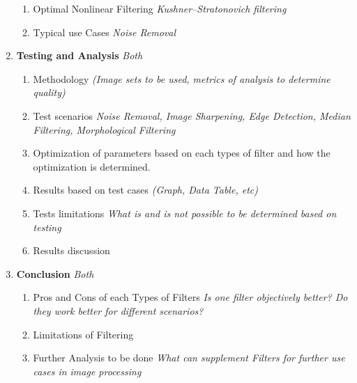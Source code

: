 \documentclass{article}
\begin{document}
\begin{enumerate}[label=\Roman*.]
\begin{enumerate}[label=\arabic*.]
                \item Optimal Nonlinear Filtering \textit{Kushner–Stratonovich filtering}
                \item Typical use Cases \textit{Noise Removal}
            \end{enumerate}
        \item \textbf{Testing and Analysis} \emph{Both}
            \begin{enumerate}[label=\arabic*.]
                \item Methodology \textit{(Image sets to be used, metrics of analysis to determine quality)}
                \item Test scenarios \textit{Noise Removal, Image Sharpening, Edge Detection, Median Filtering, Morphological Filtering}
                \item Optimization of parameters based on each types of filter and how the optimization is determined.
                \item Results based on test cases \textit{(Graph, Data Table, etc)}
                \item Tests limitations \textit{What is and is not possible to be determined based on testing}
                \item Results discussion
            \end{enumerate}
        \item \textbf{Conclusion} \emph{Both}
            \begin{enumerate}[label=\arabic*.]
                \item Pros and Cons of each Types of Filters \textit{Is one filter objectively better? Do they work better for different scenarios?}
                \item Limitations of Filtering
                \item Further Analysis to be done \textit{What can supplement Filters for further use cases in image processing}
            \end{enumerate}
    \end{enumerate}
    
\end{document}
